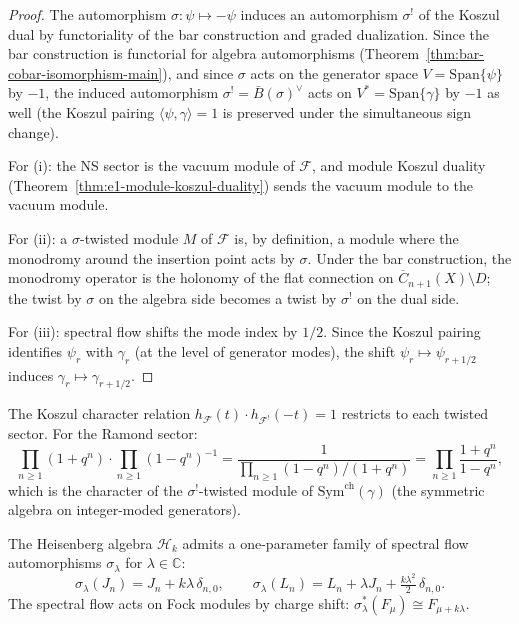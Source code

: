 \begin{proof}
The automorphism $\sigma: \psi \mapsto -\psi$ induces an automorphism
$\sigma^!$ of the Koszul dual by functoriality of the bar construction
and graded dualization. Since the bar construction is functorial for
algebra automorphisms
(Theorem~\ref{thm:bar-cobar-isomorphism-main}), and since $\sigma$ acts
on the generator space $V = \mathrm{Span}\{\psi\}$ by $-1$, the induced
automorphism $\sigma^! = \bar{B}(\sigma)^\vee$ acts on
$V^* = \mathrm{Span}\{\gamma\}$ by $-1$ as well (the Koszul pairing
$\langle \psi, \gamma \rangle = 1$ is preserved under the simultaneous
sign change).

For (i): the NS sector is the vacuum module of $\mathcal{F}$, and
module Koszul duality (Theorem~\ref{thm:e1-module-koszul-duality}) sends
the vacuum module to the vacuum module.

For (ii): a $\sigma$-twisted module $M$ of $\mathcal{F}$ is, by
definition, a module where the monodromy around the insertion point
acts by $\sigma$. Under the bar construction, the monodromy operator
is the holonomy of the flat connection on
$\overline{C}_{n+1}(X) \setminus D$; the twist by $\sigma$ on the
algebra side becomes a twist by $\sigma^!$ on the dual side.

For (iii): spectral flow shifts the mode index by $1/2$. Since the
Koszul pairing identifies $\psi_r$ with $\gamma_r$
(at the level of generator modes), the shift
$\psi_r \mapsto \psi_{r+1/2}$ induces
$\gamma_r \mapsto \gamma_{r+1/2}$.
\end{proof}

\begin{remark}
\label{rem:twisted-character-identity}
The Koszul character relation
$h_{\mathcal{F}}(t) \cdot h_{\mathcal{F}^!}(-t) = 1$ restricts to
each twisted sector. For the Ramond sector:
\[
\prod_{n \geq 1}(1 + q^n) \cdot \prod_{n \geq 1}(1 - q^n)^{-1}
= \frac{1}{\prod_{n \geq 1}(1 - q^n)/(1 + q^n)}
= \prod_{n \geq 1}\frac{1 + q^n}{1 - q^n},
\]
which is the character of the $\sigma^!$-twisted module of
$\mathrm{Sym}^{\mathrm{ch}}(\gamma)$ (the symmetric algebra on
integer-moded generators).
\end{remark}

\begin{definition}\label{def:heisenberg-spectral-flow}
The Heisenberg algebra $\mathcal{H}_k$ admits a one-parameter
family of spectral flow automorphisms $\sigma_\lambda$ for
$\lambda \in \mathbb{C}$:
\[
\sigma_\lambda(J_n) = J_n + k\lambda\,\delta_{n,0},
\qquad
\sigma_\lambda(L_n) = L_n + \lambda J_n
+ \tfrac{k\lambda^2}{2}\,\delta_{n,0}.
\]
The spectral flow acts on Fock modules by charge shift:
$\sigma_\lambda^*(F_\mu) \cong F_{\mu + k\lambda}$.
\end{definition}

